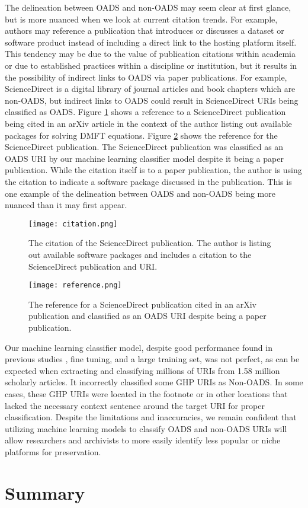 The delineation between OADS and non-OADS may seem clear at first glance, but is more nuanced when we look at current citation trends. For example, authors may reference a publication that introduces or discusses a dataset or software product instead of including a direct link to the hosting platform itself. This tendency may be due to the value of publication citations within academia or due to established practices within a discipline or institution, but it results in the possibility of indirect links to OADS via paper publications. For example, ScienceDirect is a digital library of journal articles and book chapters which are non-OADS, but indirect links to OADS could result in ScienceDirect URIs being classified as OADS. Figure \ref{fig:citation} shows a reference to a ScienceDirect publication being cited in an arXiv article in the context of the author listing out available packages for solving DMFT equations. Figure \ref{fig:reference} shows the reference for the ScienceDirect publication. The ScienceDirect publication was classified as an OADS URI by our machine learning classifier model despite it being a paper publication. While the citation itself is to a paper publication, the author is using the citation to indicate a software package discussed in the publication. This is one example of the delineation between OADS and non-OADS being more nuanced than it may first appear. 

\begin{figure}
    \centering
    \texttt{[image: citation.png]}
    \caption{The citation of the ScienceDirect publication. The author is listing out available software packages and includes a citation to the ScienceDirect publication and URI.}
    \label{fig:citation}
\end{figure}

\begin{figure}
    \centering
    \texttt{[image: reference.png]}
    \caption{The reference for a ScienceDirect publication cited in an arXiv publication and classified as an OADS URI despite being a paper publication.}
    \label{fig:reference}
\end{figure}

Our machine learning classifier model, despite good performance found in previous studies \cite{salsabil2022study}, fine tuning, and a large training set, was not perfect, as can be expected when extracting and classifying millions of URIs from 1.58 million scholarly articles. It incorrectly classified some GHP URIs as Non-OADS. In some cases, these GHP URIs were located in the footnote or in other locations that lacked the necessary context sentence around the target URI for proper classification. Despite the limitations and inaccuracies, we remain confident that utilizing machine learning models to classify OADS and non-OADS URIs will allow researchers and archivists to more easily identify less popular or niche platforms for preservation.

\section{Summary}